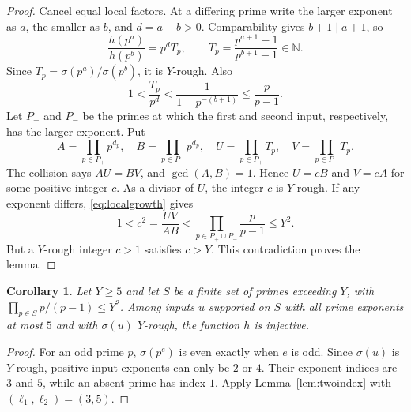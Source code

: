 \documentclass[11pt]{article}
\newtheorem{corollary}[theorem]{Corollary}
\newcommand{\NN}{\mathbb N}
\begin{document}
\begin{proof}
Cancel equal local factors. At a differing prime write the larger exponent as $a$, the smaller as $b$, and $d=a-b>0$. Comparability gives $b+1\mid a+1$, so
\[
 \frac{h(p^a)}{h(p^b)}=p^d T_p,\qquad
 T_p=\frac{p^{a+1}-1}{p^{b+1}-1}\in\NN.
\]
Since $T_p=\sigma(p^a)/\sigma(p^b)$, it is $Y$-rough. Also
\begin{equation}\label{eq:localgrowth}
 1<\frac{T_p}{p^d}<\frac{1}{1-p^{-(b+1)}}\le\frac{p}{p-1}.
\end{equation}
Let $P_+$ and $P_-$ be the primes at which the first and second input, respectively, has the larger exponent. Put
\[
 A=\prod_{p\in P_+}p^{d_p},\quad
 B=\prod_{p\in P_-}p^{d_p},\quad
 U=\prod_{p\in P_+}T_p,\quad
 V=\prod_{p\in P_-}T_p.
\]
The collision says $AU=BV$, and $\gcd(A,B)=1$. Hence $U=cB$ and $V=cA$ for some positive integer $c$. As a divisor of $U$, the integer $c$ is $Y$-rough. If any exponent differs, \eqref{eq:localgrowth} gives
\[
 1<c^2=\frac{UV}{AB}
 <\prod_{p\in P_+\cup P_-}\frac{p}{p-1}
 \le Y^2.
\]
But a $Y$-rough integer $c>1$ satisfies $c>Y$. This contradiction proves the lemma.
\end{proof}

\begin{corollary}\label{cor:capfive}
Let $Y\ge5$ and let $S$ be a finite set of primes exceeding $Y$, with $\prod_{p\in S}p/(p-1)\le Y^2$. Among inputs $u$ supported on $S$ with all prime exponents at most $5$ and with $\sigma(u)$ $Y$-rough, the function $h$ is injective.
\end{corollary}
\begin{proof}
For an odd prime $p$, $\sigma(p^e)$ is even exactly when $e$ is odd. Since $\sigma(u)$ is $Y$-rough, positive input exponents can only be $2$ or $4$. Their exponent indices are $3$ and $5$, while an absent prime has index $1$. Apply Lemma~\ref{lem:twoindex} with $(\ell_1,\ell_2)=(3,5)$.
\end{proof}
\end{document}
